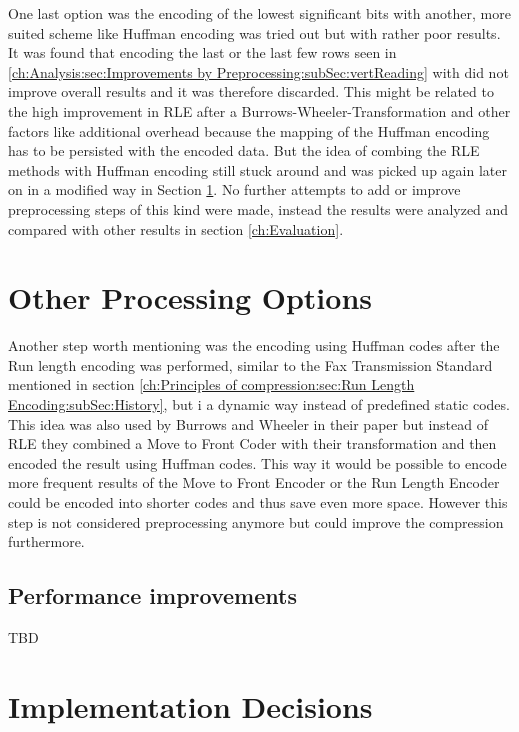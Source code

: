 {\begin{table}[H]
	\label{tab:t5:Calgary Corpus encoded, all preprocessing steps, using 3 bits per RLE run and 7 for the 3 most significance bits}
\end{table}
\par{
One last option was the encoding of the lowest significant bits with another, more suited scheme like Huffman encoding was tried out but with rather poor results. It was found that encoding the last or the last few rows seen in \ref{ch:Analysis:sec:Improvements by Preprocessing:subSec:vertReading} with did not improve overall results and it was therefore discarded. This might be related to the high improvement in RLE after a Burrows-Wheeler-Transformation and other factors like additional overhead because the mapping of the Huffman encoding has to be persisted with the encoded data. But the idea of combing the RLE methods with Huffman encoding still stuck around and was picked up again later on in a modified way in Section \ref{ch:Conceptual Design:sec:Postprocessing}. No further attempts to add or improve preprocessing steps of this kind were made, instead the results were analyzed and compared with other results in section \ref{ch:Evaluation}.
}
\section{Other Processing Options}
\label{ch:Conceptual Design:sec:Postprocessing}
Another step worth mentioning was the encoding using Huffman codes after the Run length encoding was performed, similar to the Fax Transmission Standard mentioned in section \ref{ch:Principles of compression:sec:Run Length Encoding:subSec:History}, but i a dynamic way instead of predefined static codes. This idea was also used by Burrows and Wheeler in their paper \cite{Burrows94} but instead of RLE they combined a Move to Front Coder with their transformation and then encoded the result using Huffman codes. This way it would be possible to encode more frequent results of the Move to Front Encoder or the Run Length Encoder could be encoded into shorter codes and thus save even more space. However this step is not considered preprocessing anymore but could improve the compression furthermore.

\subsection{Performance improvements}
TBD
\section{Implementation Decisions}
\label{ch:Conceptual Design:sec:Implementation Decisions}

}
